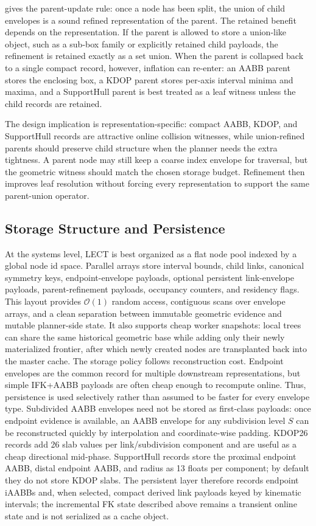 \documentclass[journal]{IEEEtran}
\begin{document}
 gives the parent-update rule: once a node has
been split, the union of child envelopes is a sound refined representation of
the parent. The retained benefit depends on the representation.
If the parent is allowed to store a union-like object, such as a sub-box family
or explicitly retained child payloads, the refinement is retained exactly as a
set union. When the parent is collapsed back to a single compact record,
however, inflation can re-enter: an AABB parent stores the enclosing box, a
KDOP parent stores per-axis interval minima and maxima, and a SupportHull
parent is best treated as a leaf witness unless the child records are retained.

The design implication is representation-specific: compact AABB, KDOP, and
SupportHull records are attractive online collision witnesses, while
union-refined parents should preserve child structure when the planner needs
the extra tightness. A parent node may still keep a coarse index envelope for
traversal, but the geometric witness should match the chosen storage budget.
Refinement then improves leaf resolution without forcing every representation
to support the same parent-union operator.

\subsection{Storage Structure and Persistence}\label{sec:lect_storage}

At the systems level, LECT is best organized as a flat node pool indexed by a
global node id space. Parallel arrays store interval bounds, child links,
canonical symmetry keys, endpoint-envelope payloads, optional persistent
link-envelope payloads, parent-refinement payloads, occupancy counters, and
residency flags. This layout provides
$\mathcal{O}(1)$ random access, contiguous scans over envelope arrays, and a
clean separation between immutable geometric evidence and mutable planner-side
state. It also supports cheap worker snapshots: local trees can share the same
historical geometric base while adding only their newly materialized frontier,
after which newly created nodes are transplanted back into the master cache.
The storage policy follows reconstruction cost. Endpoint envelopes are the
common record for multiple downstream representations, but simple IFK+AABB
payloads are often cheap enough to recompute online. Thus, persistence is used
selectively rather than assumed to be faster for every envelope type. Subdivided
AABB envelopes need not be stored as first-class payloads: once endpoint
evidence is available, an AABB envelope for any subdivision level $S$ can be
reconstructed quickly by interpolation and coordinate-wise padding. KDOP26
records add 26 slab values per link/subdivision component and are useful as a
cheap directional mid-phase. SupportHull records store the proximal endpoint
AABB, distal endpoint AABB, and radius as 13 floats per component; by default
they do not store KDOP slabs. The persistent layer therefore records endpoint
iAABBs and, when selected, compact derived link payloads keyed by kinematic
intervals; the incremental FK state described above remains a transient online
state and is not serialized as a cache object.
\end{document}
